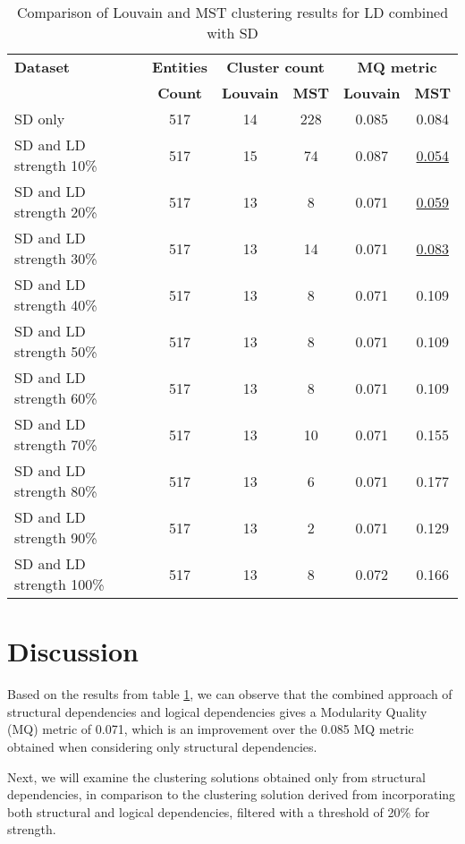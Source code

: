 \documentclass[conference]{IEEEtran}
\begin{document}
\begin{table}[htbp]
  \centering
  \caption{Comparison of Louvain and MST clustering results for LD combined with SD}
  \label{tab:clustering-results2}
  \begin{tabular}{lc|cc|cc}
    \toprule
    \textbf{Dataset} & \textbf{Entities} & \multicolumn{2}{c}{\textbf{Cluster count}} & \multicolumn{2}{c}{\textbf{MQ metric}} \\
    & \textbf{Count} & \textbf{Louvain} & \textbf{MST} & \textbf{Louvain} & \textbf{MST} \\
    \midrule
    SD only & 517 & 14 & 228 & 0.085 & 0.084 \\
    SD and LD strength 10\% & 517 & 15 & 74 & 0.087 & \underline{0.054} \\
    SD and LD strength 20\% & 517 & 13 & 8 & 0.071 & \underline{0.059} \\
    SD and LD strength 30\% & 517 & 13 & 14 & 0.071 & \underline{0.083} \\
    SD and LD strength 40\% & 517 & 13 & 8 & 0.071 & 0.109 \\
    SD and LD strength 50\% & 517 & 13 & 8 & 0.071 & 0.109 \\
    SD and LD strength 60\% & 517 & 13 & 8 & 0.071 & 0.109 \\
    SD and LD strength 70\% & 517 & 13 & 10 & 0.071 & 0.155 \\
    SD and LD strength 80\% & 517 & 13 & 6 & 0.071 & 0.177 \\
    SD and LD strength 90\% & 517 & 13 & 2 & 0.071 & 0.129 \\
    SD and LD strength 100\% & 517 & 13 & 8 & 0.072 & 0.166 \\
    \bottomrule
  \end{tabular}
\end{table}




\section{Discussion}

Based on the results from table \ref{tab:clustering-results2}, we can observe that the combined approach of structural dependencies and logical dependencies gives a Modularity Quality (MQ) metric of 0.071, which is an improvement over the 0.085 MQ metric obtained when considering only structural dependencies. 

Next, we will examine the clustering solutions obtained only from structural dependencies, in comparison to the clustering solution derived from incorporating both structural and logical dependencies, filtered with a threshold of 20\% for strength.
\end{document}
